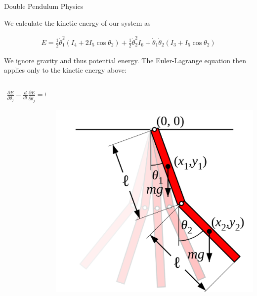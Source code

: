 \documentclass[final]{beamer}
\begin{document}
\begin{frame}{}
{\begin{columns}[t]
\begin{column}{.30\linewidth}
                

\begin{block}{\centering Double Pendulum Physics} 

We calculate the kinetic energy of our system as
	
\begin{align*}
	E = \frac{1}{2}\dot\theta_1^2(I_4 + 2I_5\cos\theta_2)
	+ \frac{1}{2}\dot\theta_2^2I_6
	+ \dot\theta_1\dot\theta_2(I_3 + I_5 \cos\theta_2)
\end{align*}

We ignore gravity and thus potential energy. The Euler-Lagrange equation then applies
only to the kinetic energy above:

\begin{columns}[T]
\begin{column}{16cm}{}
\begin{align*}
\frac{\partial E}{\partial \theta_j} - 
\frac{d}{dt}\frac{\partial E}{\partial \dot{\theta_j}} = 0
\end{align*}
\end{column}
\begin{column}{16cm}{}
\centering\includegraphics[height=12cm, width = 12cm]{figures/double-pendulum.png}\\
\end{column}


\end{columns}
\end{block}
\end{column}
\end{columns}}
\end{frame}
\end{document}
